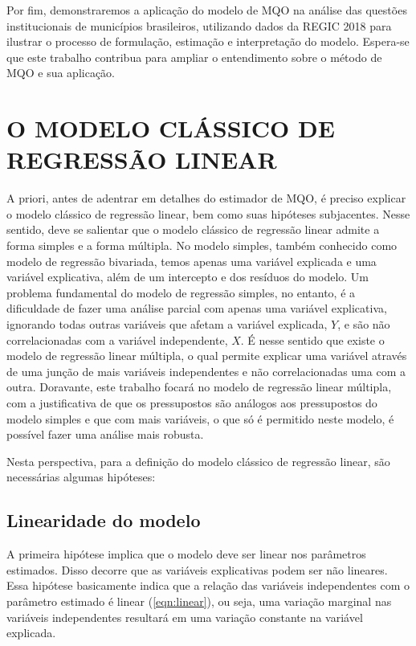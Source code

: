 \documentclass[a4paper,12pt]{article}
\begin{document}
Por fim, demonstraremos a aplicação do modelo de MQO na análise das
questões institucionais de municípios brasileiros, utilizando dados da
REGIC 2018 para ilustrar o processo de formulação, estimação e
interpretação do modelo. Espera-se que este trabalho contribua para
ampliar o entendimento sobre o método de MQO e sua aplicação.

\hypertarget{o-modelo-cluxe1ssico-de-regressuxe3o-linear}{%
\section{O MODELO CLÁSSICO DE REGRESSÃO
LINEAR}\label{o-modelo-cluxe1ssico-de-regressuxe3o-linear}}

A priori, antes de adentrar em detalhes do estimador de MQO, é preciso
explicar o modelo clássico de regressão linear, bem como suas hipóteses
subjacentes. Nesse sentido, deve se salientar que o modelo clássico de
regressão linear admite a forma simples e a forma múltipla. No modelo
simples, também conhecido como modelo de regressão bivariada, temos
apenas uma variável explicada e uma variável explicativa, além de um
intercepto e dos resíduos do modelo. Um problema fundamental do modelo
de regressão simples, no entanto, é a dificuldade de fazer uma análise
parcial com apenas uma variável explicativa, ignorando todas outras
variáveis que afetam a variável explicada, \(Y\), e são não
correlacionadas com a variável independente, \(X\). É nesse sentido que
existe o modelo de regressão linear múltipla, o qual permite explicar
uma variável através de uma junção de mais variáveis independentes e não
correlacionadas uma com a outra. Doravante, este trabalho focará no
modelo de regressão linear múltipla, com a justificativa de que os
pressupostos são análogos aos pressupostos do modelo simples e que com
mais variáveis, o que só é permitido neste modelo, é possível fazer uma
análise mais robusta.

Nesta perspectiva, para a definição do modelo clássico de regressão
linear, são necessárias algumas hipóteses:

\hypertarget{linearidade-do-modelo}{%
\subsection{Linearidade do modelo}\label{linearidade-do-modelo}}

A primeira hipótese implica que o modelo deve ser linear nos parâmetros
estimados. Disso decorre que as variáveis explicativas podem ser não
lineares. Essa hipótese basicamente indica que a relação das variáveis
independentes com o parâmetro estimado é linear (\ref{eqn:linear}), ou
seja, uma variação marginal nas variáveis independentes resultará em uma
variação constante na variável explicada.
\end{document}
